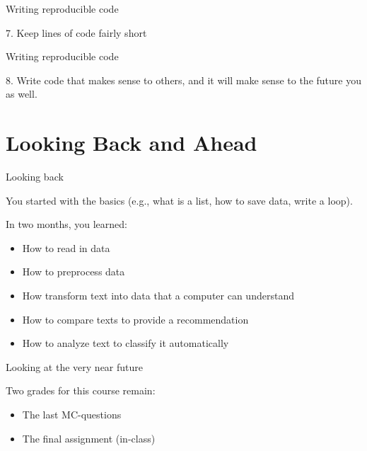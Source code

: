 \documentclass[compress]{beamer}
\begin{document}
\begin{frame}{Writing reproducible code}
	
	7. Keep lines of code fairly short
	
	
\end{frame}


\begin{frame}{Writing reproducible code}
	
	8. Write code that makes sense to others, and it will make sense to the future you as well.
	
\end{frame}



\section{Looking Back and Ahead}

\begin{frame}{Looking back} 
	
	You started with the basics (e.g., what is a list, how to save data, write a loop).\\
	\begin{alertblock}{In two months, you learned:}
		\begin{itemize}
			\item How to read in data
			\item How to preprocess data
			\item How transform text into data that a computer can understand
			\item How to compare texts to provide a recommendation
			\item How to analyze text to classify it automatically		
		\end{itemize}
	\end{alertblock}	
\end{frame}


\begin{frame}{Looking at the very near future} 
	
	\begin{alertblock}{Two grades for this course remain:}
		\begin{itemize}
			\item The last MC-questions 
			\item The final assignment (in-class) 
		\end{itemize}
	\end{alertblock}	
\end{frame}
\end{document}
